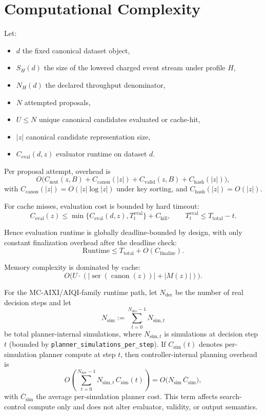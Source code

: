 \documentclass[11pt]{article}
\begin{document}
\section{Computational Complexity}\label{sec:computational-complexity}

Let:
\begin{itemize}
    \item $d$ the fixed canonical dataset object,
    \item $S_H(d)$ the size of the lowered charged event stream under profile
    $H$,
    \item $N_H(d)$ the declared throughput denominator,
    \item $N$ attempted proposals,
    \item $U\le N$ unique canonical candidates evaluated or cache-hit,
    \item $|z|$ canonical candidate representation size,
    \item $C_{\mathrm{eval}}(d,z)$ evaluator runtime on dataset $d$.
\end{itemize}

Per proposal attempt, overhead is
\[
O\big(C_{\mathrm{mut}}(z,B)+C_{\mathrm{canon}}(|z|)+C_{\mathrm{valid}}(z,B)+C_{\mathrm{hash}}(|z|)\big),
\]
with $C_{\mathrm{canon}}(|z|)=O(|z|\log|z|)$ under key sorting, and $C_{\mathrm{hash}}(|z|)=O(|z|)$.

For cache misses, evaluation cost is bounded by hard timeout:
\[
C_{\mathrm{eval}}(z) \le
\min\{C_{\mathrm{eval}}(d,z),T_t^{\mathrm{eval}}\}+C_{\mathrm{kill}},
\qquad
T_t^{\mathrm{eval}}\le T_{\mathrm{total}}-t.
\]

Hence evaluation runtime is globally deadline-bounded by design, with only
constant finalization overhead after the deadline check:
\[
\mathrm{Runtime} \le T_{\mathrm{total}} + O(C_{\mathrm{finalize}}).
\]

Memory complexity is dominated by cache:
\[
O\big(U\cdot(|\operatorname{ser}(\operatorname{canon}(z))|+|M(z)|)\big).
\]

For the MC-AIXI/AIQI-family runtime path, let $N_{\mathrm{dec}}$ be the number of
real decision steps and let
\[
N_{\mathrm{sim}}:=\sum_{t=0}^{N_{\mathrm{dec}}-1}N_{\mathrm{sim},t}
\]
be total planner-internal simulations, where $N_{\mathrm{sim},t}$ is
simulations at decision step $t$ (bounded by
\texttt{planner\_simulations\_per\_step}). If
$C_{\mathrm{sim}}(t)$ denotes per-simulation planner compute at step $t$, then
controller-internal planning overhead is
\[
O\!\left(\sum_{t=0}^{N_{\mathrm{dec}}-1}N_{\mathrm{sim},t}\,C_{\mathrm{sim}}(t)\right)
=O\big(N_{\mathrm{sim}}\,\overline C_{\mathrm{sim}}\big),
\]
with $\overline C_{\mathrm{sim}}$ the average per-simulation planner cost.
This term affects search-control compute only and does not alter evaluator,
validity, or output semantics.
\end{document}
